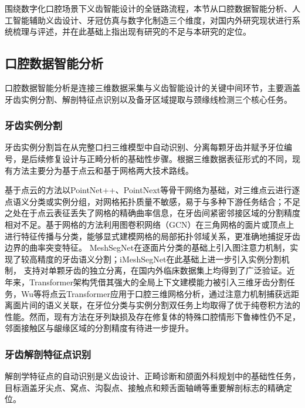 \documentclass[12pt,hyperref,a4paper,UTF8]{ctexart}
\begin{document}
围绕数字化口腔场景下义齿智能设计的全链路流程，本节从口腔数据智能分析、人工智能辅助义齿设计、牙冠仿真与数字化制造三个维度，对国内外研究现状进行系统梳理与评述，并在此基础上指出现有研究的不足与本研究的定位。

\subsection{口腔数据智能分析}

口腔数据智能分析是连接三维数据采集与义齿智能设计的关键中间环节，主要涵盖牙齿实例分割、解剖特征点识别以及备牙区域提取与颈缘线检测三个核心任务。

\subsubsection{牙齿实例分割}

牙齿实例分割旨在从完整口扫三维模型中自动识别、分离每颗牙齿并赋予牙位编号，是后续修复设计与正畸分析的基础性步骤。根据三维数据表征形式的不同，现有方法主要分为基于点云和基于网格两大技术路线。

基于点云的方法以PointNet++\cite{qi2017pointnet++}、PointNext\cite{qian2022pointnext}等骨干网络为基础，对三维点云进行逐点语义分类或实例分组，对网格拓扑质量不敏感，易于与多种下游任务结合；不足之处在于点云表征丢失了网格的精确曲率信息，在牙齿间紧密邻接区域的分割精度相对不足。基于网格的方法利用图卷积网络（GCN）在三角网格的面片或顶点上进行特征传播与分类，能够显式建模网格的局部拓扑邻域关系，更准确地捕捉牙齿边界的曲率突变特征。
MeshSegNet\cite{lian2020deep}在逐面片分类的基础上引入图注意力机制，实现了较高精度的牙齿语义分割；iMeshSegNet在此基础上进一步引入实例分割机制，
支持对单颗牙齿的独立分离，在国内外临床数据集上均得到了广泛验证。近年来，Transformer架构凭借其强大的全局上下文建模能力被引入三维牙齿分割任务，Wu等\cite{wu2024point}将点云Transformer应用于口腔三维网格分析，通过注意力机制捕获远距离面片间的语义关联，在牙位分类与实例分割双任务上均取得了优于纯卷积方法的性能。然而，现有方法在牙列缺损及存在修复体的特殊口腔情形下鲁棒性仍不足，邻面接触区与龈缘区域的分割精度有待进一步提升。

\subsubsection{牙齿解剖特征点识别}

解剖学特征点的自动识别是义齿设计、正畸诊断和颌面外科规划中的基础性任务，目标涵盖牙尖点、窝点、沟裂点、接触点和颊舌面轴嵴等重要解剖标志的精确定位。
\end{document}
